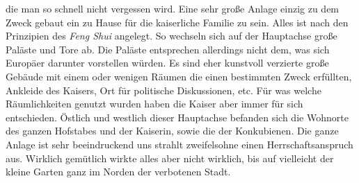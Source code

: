 \documentclass[11pt]{book}
\begin{document}
die man so schnell nicht vergessen wird. Eine sehr große Anlage einzig zu dem Zweck gebaut ein zu Hause für die kaiserliche 
Familie zu sein. Alles ist nach den Prinzipien des \emph{Feng Shui} angelegt. So wechseln sich auf der Hauptachse 
große Paläste und Tore ab. Die Paläste entsprechen allerdings nicht dem, was sich Europäer darunter vorstellen 
würden. Es sind eher kunstvoll verzierte große Gebäude mit einem oder wenigen Räumen die einen bestimmten Zweck 
erfüllten, Ankleide des Kaisers, Ort für politische Diskussionen, etc. Für was welche Räumlichkeiten genutzt wurden 
haben die Kaiser aber immer für sich entschieden. Östlich und westlich dieser Hauptachse befanden sich die Wohnorte 
des ganzen Hofstabes und der Kaiserin, sowie die der Konkubienen. Die ganze Anlage ist sehr beeindruckend uns strahlt 
zweifelsohne einen Herrschaftsanspruch aus. Wirklich gemütlich wirkte alles aber nicht wirklich, bis auf vielleicht 
der kleine Garten ganz im Norden der verbotenen Stadt.
\end{document}
